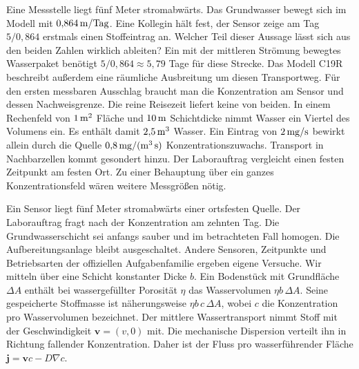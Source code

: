Eine Messstelle liegt fünf Meter stromabwärts. Das Grundwasser bewegt sich im Modell mit \(0{,}864\,\mathrm{m/Tag}\). Eine Kollegin hält fest, der Sensor zeige am Tag \(5/0{,}864\) erstmals einen Stoffeintrag an. Welcher Teil dieser Aussage lässt sich aus den beiden Zahlen wirklich ableiten?
Ein mit der mittleren Strömung bewegtes Wasserpaket benötigt \(5/0{,}864\approx5{,}79\) Tage für diese Strecke. Das Modell C19R beschreibt außerdem eine räumliche Ausbreitung um diesen Transportweg. Für den ersten messbaren Ausschlag braucht man die Konzentration am Sensor und dessen Nachweisgrenze. Die reine Reisezeit liefert keine von beiden.
In einem Rechenfeld von \(1\,\mathrm{m^2}\) Fläche und \(10\,\mathrm{m}\) Schichtdicke nimmt Wasser ein Viertel des Volumens ein. Es enthält damit \(2{,}5\,\mathrm{m^3}\) Wasser. Ein Eintrag von \(2\,\mathrm{mg/s}\) bewirkt allein durch die Quelle \(0{,}8\,\mathrm{mg/(m^3\,s)}\) Konzentrationszuwachs. Transport in Nachbarzellen kommt gesondert hinzu.
Der Laborauftrag vergleicht einen festen Zeitpunkt am festen Ort. Zu einer Behauptung über ein ganzes Konzentrationsfeld wären weitere Messgrößen nötig.


Ein Sensor liegt fünf Meter stromabwärts einer ortsfesten Quelle. Der Laborauftrag fragt nach der Konzentration am zehnten Tag. Die Grundwasserschicht sei anfangs sauber und im betrachteten Fall homogen. Die Aufbereitungsanlage bleibt ausgeschaltet. Andere Sensoren, Zeitpunkte und Betriebsarten der offiziellen Aufgabenfamilie ergeben eigene Versuche.
Wir mitteln über eine Schicht konstanter Dicke \(b\). Ein Bodenstück mit Grundfläche \(\Delta A\) enthält bei wassergefüllter Porosität \(\eta\) das Wasservolumen \(\eta b\,\Delta A\). Seine gespeicherte Stoffmasse ist näherungsweise \(\eta b\,c\,\Delta A\), wobei \(c\) die Konzentration pro Wasservolumen bezeichnet. Der mittlere Wassertransport nimmt Stoff mit der Geschwindigkeit \(\mathbf v=(v,0)\) mit. Die mechanische Dispersion verteilt ihn in Richtung fallender Konzentration. Daher ist der Fluss pro wasserführender Fläche \(\mathbf j=\mathbf v c-D\nabla c\).

